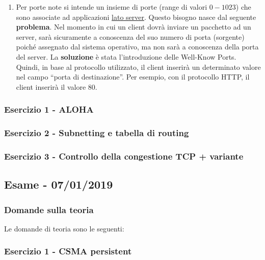 \documentclass[a4paper]{article}
\newcommand{\dquotes}[1]{``#1''}
\begin{document}
\begin{enumerate}
		\item Per porte note si intende un insieme di porte (range di valori $0-1023$) che sono associate ad applicazioni \underline{lato server}. Questo bisogno nasce dal seguente \textbf{problema}.\newline
		Nel momento in cui un client dovrà inviare un pacchetto ad un server, sarà sicuramente a conoscenza del suo numero di porta (sorgente) poiché assegnato dal sistema operativo, ma non sarà a conoscenza della porta del server.\newline
		La \textbf{soluzione} è stata l'introduzione delle Well-Know Ports. Quindi, in base al protocollo utilizzato, il client inserirà un determinato valore nel campo \dquotes{porta di destinazione}. Per esempio, con il protocollo HTTP, il client inserirà il valore 80.
	\end{enumerate}
	
	\subsubsection{Esercizio 1 - ALOHA}
	
	\subsubsection{Esercizio 2 - Subnetting e tabella di routing}
	
	\subsubsection{Esercizio 3 - Controllo della congestione TCP + variante}
	
	\newpage

	\subsection[\textbf{Esame - 07/01/2019}]{Esame - 07/01/2019}

	\subsubsection{Domande sulla teoria}
	Le domande di teoria sono le seguenti:
	
	\subsubsection{Esercizio 1 - CSMA persistent}
	
\end{document}
